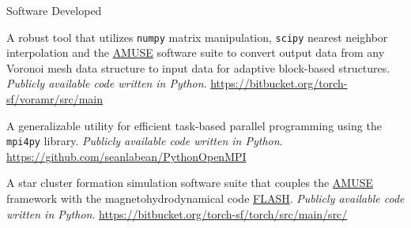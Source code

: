 \documentclass{resume} %
\begin{document}

\begin{rSection}{Software Developed}

\underline{}

\begin{description}[leftmargin=10em, style=nextline]

\item[\texttt{VorAMR}] A robust tool that utilizes \texttt{numpy} matrix manipulation, \texttt{scipy} nearest neighbor interpolation and the \href{https://www.amusecode.org/}{AMUSE} software suite to convert output data from any Voronoi mesh data structure to input data for adaptive block-based structures.  \textit{Publicly available code written in Python}. \href{https://bitbucket.org/torch-sf/vor-amr/src/main/}{https://bitbucket.org/torch-sf/voramr/src/main}

\item[\texttt{PythonOpenMPI}] A generalizable utility for efficient task-based parallel programming using the \texttt{mpi4py} library. \textit{Publicly available code written in Python}.\\ \href{https://github.com/seanlabean/PythonOpenMPI}{https://github.com/seanlabean/PythonOpenMPI}

\end{description}

\underline{}

\begin{description}[leftmargin=10em, style=nextline]

\item[\texttt{Torch}] A star cluster formation simulation software suite that couples the \href{https://www.amusecode.org/}{AMUSE} framework with the magnetohydrodynamical code  \href{https://flash.rochester.edu/site/flashcode/user_support/}{FLASH}.  \textit{Publicly available code written in Python}. \href{https://bitbucket.org/torch-sf/torch/src/main/src/}{https://bitbucket.org/torch-sf/torch/src/main/src/}

\end{description}

\end{rSection}

\end{document}
